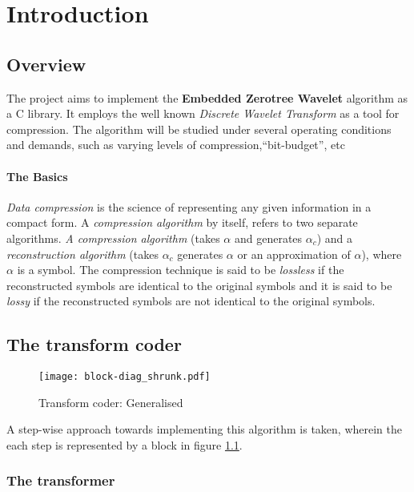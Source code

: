 \documentclass[./A14_Report.tex]{subfiles}
\begin{document}
\chapter{Introduction}
\section{Overview}
\label{sec:overview}

The project aims to implement the \textbf{Embedded Zerotree Wavelet} algorithm
as a C library. It employs the well known \textit{Discrete Wavelet Transform}
as a tool for compression. The algorithm will be studied under several
operating conditions and demands, such as varying levels of
compression,``bit-budget'', etc

\subsubsection{The Basics}%
\label{sec:the_basics}

\textit{Data compression} is the science of representing any given information
in a compact form. A \textit{compression algorithm} by itself, refers to two
separate algorithms. \textit{A compression algorithm} (takes $\alpha$ and
generates $\alpha_c$) and a \textit {reconstruction algorithm} (takes
$\alpha_c$ generates $\alpha$ or an approximation of $\alpha$), where $\alpha$
is a symbol. The compression technique is said to be \textit{lossless} if the
reconstructed symbols are identical to the original symbols and it is said to
be \textit{lossy} if the  reconstructed symbols are not identical to the
original symbols.

\section{The transform coder}
\label{sec:the_transform_coder}

\begin{figure}[h]
    \centering
    \texttt{[image: block-diag\_shrunk.pdf]}
    \caption{Transform coder: Generalised \cite{shap1993}}
    \label{fig:tcoder}
\end{figure}

A step-wise approach towards implementing this algorithm is taken, wherein
the each step is represented by a block in figure \ref{fig:tcoder}.

\pagebreak

\subsection{The transformer}
\label{sec:the_transformer}
\end{document}
